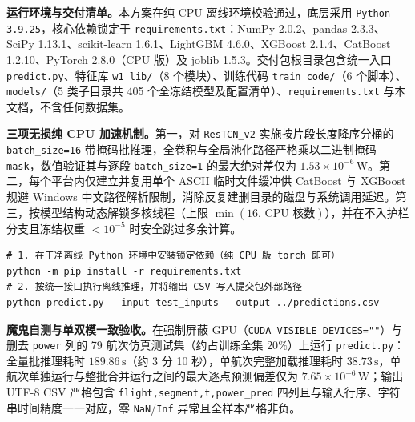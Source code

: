 \documentclass[UTF8,a4paper,11pt,fontset=windows]{ctexart}
\newcommand{\W}{\,\mathrm{W}}
\newcommand{\code}[1]{\texttt{#1}}
\begin{document}
\textbf{运行环境与交付清单。}本方案在纯 CPU 离线环境校验通过，底层采用 \code{Python 3.9.25}，核心依赖锁定于 \code{requirements.txt}：NumPy 2.0.2、pandas 2.3.3、SciPy 1.13.1、scikit-learn 1.6.1、LightGBM 4.6.0、XGBoost 2.1.4、CatBoost 1.2.10、PyTorch 2.8.0（CPU 版）及 joblib 1.5.3。交付包根目录包含统一入口 \code{predict.py}、特征库 \code{w1\_lib/}（8 个模块）、训练代码 \code{train\_code/}（6 个脚本）、\code{models/}（5 类子目录共 405 个全冻结模型及配置清单）、\code{requirements.txt} 与本文档，不含任何数据集。

\textbf{三项无损纯 CPU 加速机制。}第一，对 \code{ResTCN\_v2} 实施按片段长度降序分桶的 \code{batch\_size=16} 带掩码批推理，全卷积与全局池化路径严格乘以二进制掩码 \code{mask}，数值验证其与逐段 \code{batch\_size=1} 的最大绝对差仅为 $1.53\times 10^{-6}\W$。第二，每个平台内仅建立并复用单个 ASCII 临时文件缓冲供 CatBoost 与 XGBoost 规避 Windows 中文路径解析限制，消除反复建删目录的磁盘与系统调用延迟。第三，按模型结构动态解锁多核线程（上限 $\min(16,\,\text{CPU 核数})$），并在不入护栏分支且冻结权重 $<10^{-5}$ 时安全跳过多余计算。

\begin{lstlisting}
# 1. 在干净离线 Python 环境中安装锁定依赖（纯 CPU 版 torch 即可）
python -m pip install -r requirements.txt
# 2. 按统一接口执行离线推理，并将输出 CSV 写入提交包外部路径
python predict.py --input test_inputs --output ../predictions.csv
\end{lstlisting}

\textbf{魔鬼自测与单双模一致验收。}在强制屏蔽 GPU（\code{CUDA\_VISIBLE\_DEVICES=""}）与删去 \code{power} 列的 79 航次仿真测试集（约占训练全集 $20\%$）上运行 \code{predict.py}：全量批推理耗时 $189.86\,\mathrm{s}$（约 3 分 10 秒），单航次完整加载推理耗时 $38.73\,\mathrm{s}$，单航次单独运行与整批合并运行之间的最大逐点预测偏差仅为 $7.65\times 10^{-6}\W$；输出 UTF-8 CSV 严格包含 \code{flight,segment,t,power\_pred} 四列且与输入行序、字符串时间精度一一对应，零 \code{NaN}/\code{Inf} 异常且全样本严格非负。
\end{document}
